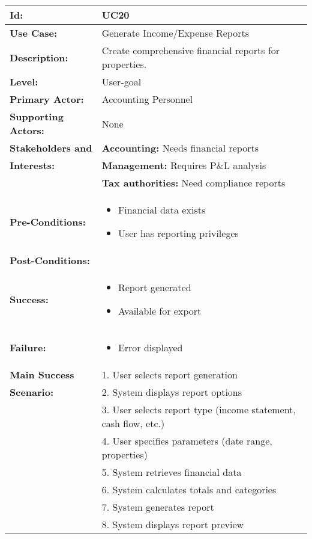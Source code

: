 \documentclass[12pt]{article}
\begin{document}
\begin{tabular}{|p{3cm}|p{11cm}|}
\hline
\textbf{Id:} & UC20 \\
\hline
\textbf{Use Case:} & Generate Income/Expense Reports \\
\hline
\textbf{Description:} & Create comprehensive financial reports for properties. \\
\hline
\textbf{Level:} & User-goal \\
\hline
\textbf{Primary Actor:} & Accounting Personnel \\
\hline
\textbf{Supporting Actors:} & None \\
\hline
\textbf{Stakeholders and} & \textbf{Accounting:} Needs financial reports \\
\textbf{Interests:} & \textbf{Management:} Requires P\&L analysis \\
& \textbf{Tax authorities:} Need compliance reports \\
\hline
\textbf{Pre-Conditions:} & 
\begin{itemize}
    \item Financial data exists
    \item User has reporting privileges
\end{itemize} \\
\hline
\textbf{Post-Conditions:} & \\
\textbf{Success:} & 
\begin{itemize}
    \item Report generated
    \item Available for export
\end{itemize} \\
\textbf{Failure:} & 
\begin{itemize}
    \item Error displayed
\end{itemize} \\
\hline
\textbf{Main Success} & 1. User selects report generation \\
\textbf{Scenario:} & 2. System displays report options \\
& 3. User selects report type (income statement, cash flow, etc.) \\
& 4. User specifies parameters (date range, properties) \\
& 5. System retrieves financial data \\
& 6. System calculates totals and categories \\
& 7. System generates report \\
& 8. System displays report preview \\

\end{tabular}
\end{document}
